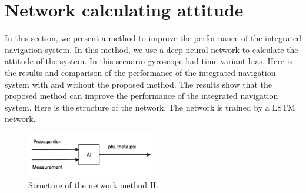 \documentclass[conference]{IEEEtran}
\begin{document}
    \section{Network calculating attitude}
    In this section, we present a method to improve the performance of the integrated navigation system. In this method, we use a deep neural network to calculate the attitude of the system. In this scenario gyroscope had time-variant bias. Here is the results and comparison of the performance of the integrated navigation system with and without the proposed method. The results show that the proposed method can improve the performance of the integrated navigation system. Here is the structure of the network. The network is trained by a LSTM network.
    \begin{figure}[H]
        \centerline{\includegraphics[width=0.5\textwidth]{../Figures/part_2_network.png}}
        \caption{Structure of the network method II.}
    \end{figure}
    
\end{document}

